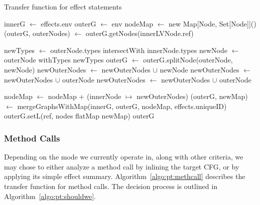 \documentclass[a4paper]{article}
\begin{document}
\begin{algorithm}
\caption{Transfer function for effect statements}\label{algo:pt:effects}
\begin{algorithmic}[1]
    \State innerG $\gets$ effects.env
    \State outerG $\gets$ env
    \State nodeMap $\gets$ new Map[Node, Set[Node]]()
        \State (outerG, outerNodes) $\gets$ outerG.getNodes(innerLVNode.ref)

                \State newTypes $\gets$ outerNode.types intersectWith innerNode.types
                    \State newNode $\gets$ outerNode withTypes newTypes
                    \State outerG $\gets$ outerG.splitNode(outerNode, newNode)
                    \State newOuterNodes $\gets$ newOuterNodes $\cup$ newNode
                \Else
                    \State newOuterNodes $\gets$ newOuterNodes $\cup$ outerNode
                \EndIf
            \Else
                \State newOuterNodes $\gets$ newOuterNodes $\cup$ outerNode
            \EndIf

        \EndFor
        \State nodeMap $\gets$ nodeMap + (innerNode $\mapsto$ newOuterNodes)
    \EndFor
    \State
    \State (outerG, newMap) $\gets$ mergeGraphsWithMap(innerG, outerG, nodeMap, effects.uniqueID)
    \State
        \State outerG.setL(ref, nodes flatMap newMap)
    \EndFor
    \State
    \State \Return outerG
\EndFunction
\end{algorithmic}
\end{algorithm}

\subsubsection{Method Calls}
Depending on the mode we currently operate in, along with other criteria, we
may chose to either analyze a method call by inlining the target CFG, or by
applying its simple effect summary. Algorithm~\ref{algo:pt:methcall} describes
the transfer function for method calls. The decision process is outlined in
Algorithm~\ref{algo:pt:shouldwe}.
\end{document}
